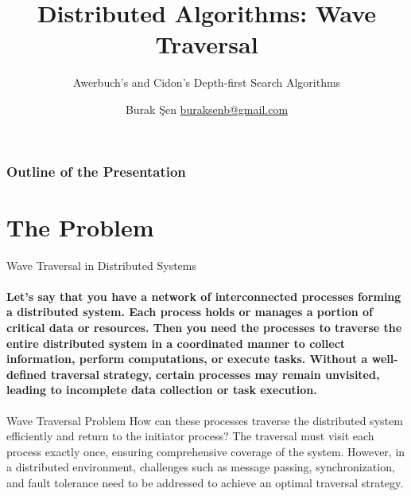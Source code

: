 \documentclass[11pt]{beamer}              %
\author[Burak Şen]{Burak Şen \href{mailto:buraksenb@gmail.com}{buraksenb@gmail.com}}
\title[WINS Beamer Template]{Distributed Algorithms: Wave Traversal}
\subtitle[Short SubTitle]{Awerbuch's and Cidon's Depth-first Search Algorithms}
\begin{document}
\begin{frame}[plain]
\titlepage
{}
\end{frame}

\begin{frame}[label=toc]
    \frametitle{Outline of the Presentation}
    \tableofcontents[subsubsectionstyle=hide]

\end{frame}
%
\section{The Problem}

\begin{frame}{Wave Traversal in Distributed Systems}
\framesubtitle{Let's say that you have a network of interconnected processes forming a distributed system. Each process holds or manages a portion of critical data or resources. Then you need the processes to traverse the entire distributed system in a coordinated manner to collect information, perform computations, or execute tasks. Without a well-defined traversal strategy, certain processes may remain unvisited, leading to incomplete data collection or task execution.}
\begin{block}{Wave Traversal Problem}
How can these processes traverse the distributed system efficiently and return to the initiator process?
The traversal must visit each process exactly once, ensuring comprehensive coverage of the system.
However, in a distributed environment, challenges such as message passing, synchronization, and fault tolerance need to be addressed to achieve an optimal traversal strategy.\end{block}
\note{}
\end{frame}
\end{document}
